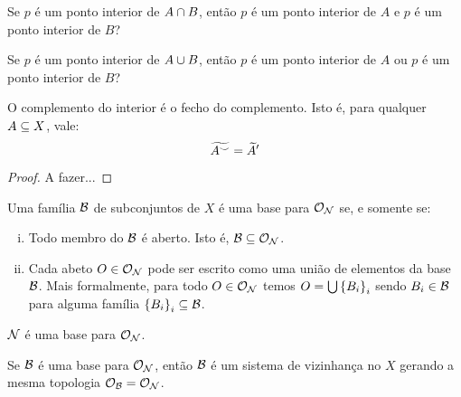 \begin{question}
	Se $p$ é um ponto interior de $A \cap B$, então $p$ é um ponto interior de $A$ e $p$ é um ponto interior de $B$?
\end{question}

\begin{question}
	Se $p$ é um ponto interior de $A \cup B$, então $p$ é um ponto interior de $A$ ou $p$ é um ponto interior de $B$?
\end{question}

\begin{theorem}
O complemento do interior é o fecho do complemento. Isto é, para qualquer $A \subseteq X$, vale:
\[
	\widetilde{A^{\smile}} = \widetilde{A}^{\prime}
\]
\end{theorem}

\begin{proof}
	A fazer...
\end{proof}

\begin{definition}[Base]
	Uma família $\mathcal{B}$ de subconjuntos de $X$ é uma base para $\mathcal{O}_{\mathcal{N}}$ se, e somente se:
	\begin{enumerate}[i)]
		\item Todo membro do $\mathcal{B}$ é aberto. Isto é, $\mathcal{B} \subseteq \mathcal{O}_{\mathcal{N}}$.
		\item Cada abeto $O \in \mathcal{O}_{\mathcal{N}}$ pode ser escrito como uma união de elementos da base $\mathcal{B}$. Mais formalmente, para todo $O \in \mathcal{O}_{\mathcal{N}}$ temos $O = \bigcup \left\{B_{i}\right\}_{i}$ sendo $B_i \in \mathcal{B}$ para alguma família $\left\{B_{i}\right\}_{i} \subseteq \mathcal{B}$.
	\end{enumerate}
\end{definition}

\begin{fact}
	$\mathcal{N}$ é uma base para $\mathcal{O}_{\mathcal{N}}$.
\end{fact}

\begin{theorem}
	Se $\mathcal{B}$ é uma base para $\mathcal{O}_{\mathcal{N}}$, então $\mathcal{B}$ é um sistema de vizinhança no $X$ gerando a mesma topologia $\mathcal{O}_{\mathcal{B}} = \mathcal{O}_{\mathcal{N}}$.
\end{theorem}

